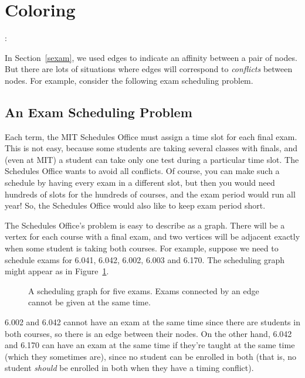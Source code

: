 \section{Coloring}\label{sec:coloring}

\begin{editingnotes}
:
\end{editingnotes}

In Section~\ref{sexam}, we used edges to indicate an affinity between a
pair of nodes.  But there are lots of situations where edges will
correspond to \emph{conflicts} between nodes.  For example, consider the
following exam scheduling problem.

\subsection{An Exam Scheduling Problem}

Each term, the MIT Schedules Office must assign a time slot for each
final exam.  This is not easy, because some students are taking
several classes with finals, and (even at MIT) a student can take only
one test during a particular time slot.  The Schedules Office wants to
avoid all conflicts.  Of course, you can make such a schedule by
having every exam in a different slot, but then you would need
hundreds of slots for the hundreds of courses, and the exam period
would run all year!  So, the Schedules Office would also like to keep
exam period short.

The Schedules Office's problem is easy to describe as a graph.  There
will be a vertex for each course with a final exam, and two vertices
will be adjacent exactly when some student is taking both courses.
For example, suppose we need to schedule exams for 6.041, 6.042,
6.002, 6.003 and 6.170.  The scheduling graph might appear as in
Figure~\ref{fig:5R}.

\begin{figure}


\caption{A scheduling graph for five exams.  Exams connected by an
  edge cannot be given at the same time.}

\label{fig:5R}

\end{figure}

6.002 and 6.042 cannot have an exam at the same time since there are
students in both courses, so there is an edge between their nodes.  On the
other hand, 6.042 and 6.170 can have an exam at the same time if they're
taught at the same time (which they sometimes are), since no student can
be enrolled in both (that is, no student \emph{should} be enrolled in both
when they have a timing conflict).

